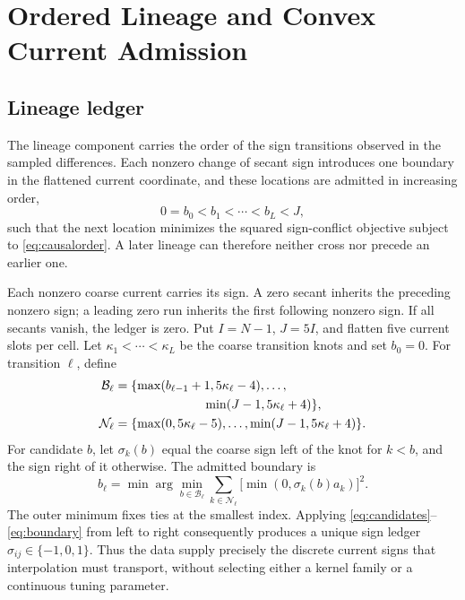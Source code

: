 \documentclass[journal]{IEEEtran}
\begin{document}
\section{Ordered Lineage and Convex Current Admission}

\subsection{Lineage ledger}

The lineage component carries the order of the sign transitions observed in
the sampled differences. Each nonzero change of secant sign introduces one
boundary in the flattened current coordinate, and these locations are
admitted in increasing order,
\begin{equation}
 0=b_0<b_1<\cdots<b_L<J,
 \label{eq:causalorder}
\end{equation}
such that the next location minimizes the squared sign-conflict objective
subject to \eqref{eq:causalorder}. A later lineage can therefore neither cross
nor precede an earlier one.

Each nonzero coarse current carries its sign. A zero secant inherits the
preceding nonzero sign; a leading zero run inherits the first following
nonzero sign. If all secants vanish, the ledger is zero. Put \(I=N-1\),
\(J=5I\), and flatten five current slots per cell. Let
\(\kappa_1<\cdots<\kappa_L\) be the coarse transition knots and set
\(b_0=0\). For transition \(\ell\), define
\begin{align}
\mathcal B_\ell
 &=\{\max(b_{\ell-1}+1,5\kappa_\ell-4),\ldots,\nonumber\\
 &\hspace{25mm}\min(J-1,5\kappa_\ell+4)\},\label{eq:candidates}\\
\mathcal N_\ell
 &=\{\max(0,5\kappa_\ell-5),\ldots,
\min(J-1,5\kappa_\ell+4)\}.\label{eq:window}
\end{align}
For candidate \(b\), let \(\sigma_k(b)\) equal the coarse sign left of the
knot for \(k<b\), and the sign right of it otherwise. The admitted boundary
is
\begin{equation}
 b_\ell=\min\arg\min_{b\in\mathcal B_\ell}
 \sum_{k\in\mathcal N_\ell}\bigl[\min(0,\sigma_k(b)a_k)\bigr]^2.
 \label{eq:boundary}
\end{equation}
The outer minimum fixes ties at the smallest index. Applying
\eqref{eq:candidates}--\eqref{eq:boundary} from left to right consequently
produces a unique sign ledger \(\sigma_{ij}\in\{-1,0,1\}\). Thus the data
supply precisely the discrete current signs that interpolation must
transport, without selecting either a kernel family or a continuous tuning
parameter.
\end{document}
